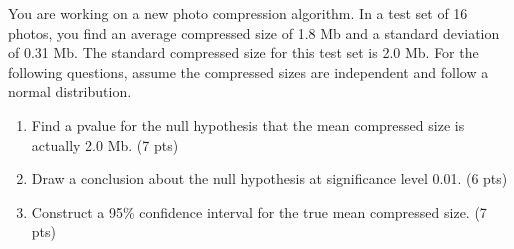 \item You are working on a new photo compression algorithm. In a test set of 16 
photos, you find an average compressed size of 1.8 Mb and a standard deviation
of 0.31 Mb. The standard compressed size for this test set is 2.0 Mb. For the 
following questions, assume the compressed sizes are independent and follow a 
normal distribution. 

\begin{enumerate}
\item Find a pvalue for the null hypothesis that the mean compressed size is actually 2.0 Mb. (7 pts)

\vfill\vfill\vfill

\item Draw a conclusion about the null hypothesis at significance level 0.01. (6 pts)

\vfill\vfill

\item Construct a 95\% confidence interval for the true mean compressed size. (7 pts)

\ansfont{
\[
1.8 \pm t_{15,0.025} 0.31/\sqrt{16} = (1.63,1.97)
\]
}
\vfill\vfill\vfill

\end{enumerate}
